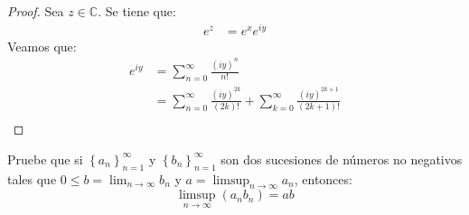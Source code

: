 \documentclass[12pt]{report}
\theoremstyle{largebreak}
\begin{document}
    \begin{proof}
        Sea $z\in\mathbb{C}$. Se tiene que:
        \begin{equation*}
            \begin{split}
                e^z&=e^{x}e^{iy}
            \end{split}
        \end{equation*}
        Veamos que:
        \begin{equation*}
            \begin{split}
                e^{ iy}&=\sum_{n=0}^\infty\frac{(iy)^n}{n!}\\
                &=\sum_{n=0}^\infty\frac{(iy)^{2k}}{(2k)!}+\sum_{k=0}^\infty\frac{(iy)^{2k+1}}{(2k+1)!}\\
            \end{split}
        \end{equation*}
    \end{proof}

    \begin{excer}
        \label{productoSucesionesLimSupLim}
        Pruebe que si $\left\{a_n\right\}_{ n=1}^\infty$ y $\left\{b_n\right\}_{ n=1}^\infty$ son dos sucesiones de números no negativos tales que $0\leq b=\lim_{ n\rightarrow\infty}b_n$ y $a=\limsup_{ n\rightarrow\infty}a_n$, entonces:
        \begin{equation*}
            \limsup_{ n\rightarrow\infty}(a_nb_n)=ab
        \end{equation*}
    \end{excer}
\end{document}
